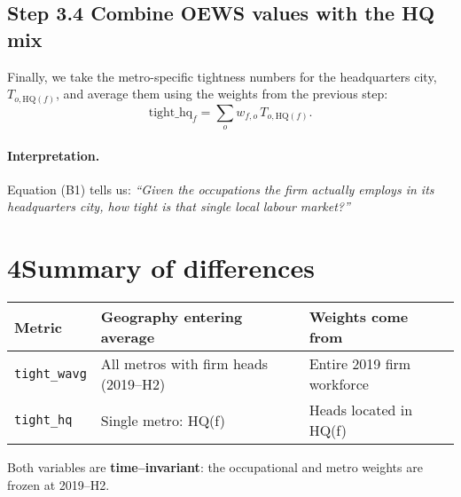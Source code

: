 \documentclass[11pt]{article}
\begin{document}
\subsection*{Step 3.4\; Combine OEWS values with the HQ mix}
Finally, we take the metro-specific tightness numbers for the
headquarters city, \(T_{o,\text{HQ}(f)}\), and average them using the
weights from the previous step:
\[
  \boxed{\text{tight\_hq}_f=\sum_o w_{f,o}\,T_{o,\text{HQ}(f)}.}\tag{B1}
\]

\paragraph{Interpretation.}  Equation (B1) tells us: \emph{“Given the
occupations the firm actually employs in its headquarters city, how
tight is that single local labour market?”}

\section*{4\quad Summary of differences}

\begin{center}
\begin{tabular}{@{}lll@{}}
\toprule
Metric           & Geography entering average        & Weights come from               \\
\midrule
\texttt{tight\_wavg} & All metros with firm heads (2019--H2) & Entire 2019 firm workforce       \\
\texttt{tight\_hq}   & Single metro: HQ(f)                   & Heads located in HQ(f)           \\
\bottomrule
\end{tabular}
\end{center}

Both variables are \textbf{time–invariant}: the occupational and metro
weights are frozen at 2019--H2.
\end{document}
